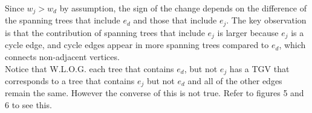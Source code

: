 \documentclass[12pt,letterpaper]{article}
\begin{document}
Since \( w_j > w_d \) by assumption, the sign of the change depends on the difference of the spanning trees that include \( e_d \) and those that include \( e_j \). The key observation is that the contribution of spanning trees that include \( e_j \) is larger because \( e_j \) is a cycle edge, and cycle edges appear in more spanning trees compared to \( e_d \), which connects non-adjacent vertices.\\

Notice that W.L.O.G. each tree that contains $e_d$, but not $e_j$ has a TGV that corresponds to a tree that contains $e_j$ but not $e_d$ and all of the other edges remain the same. However the converse of this is not true. Refer to figures 5 and 6 to see this.\\

\begin{figure}[h!]
\centering
{}
\end{figure}
\end{document}
